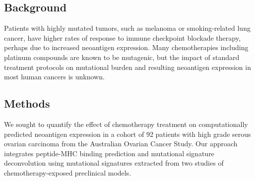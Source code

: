 \subsection*{Background}
Patients with highly mutated tumors, such as melanoma or smoking-related lung cancer, have higher rates of response to immune checkpoint blockade therapy, perhaps due to increased neoantigen expression. Many chemotherapies including platinum compounds are known to be mutagenic, but the impact of standard treatment protocols on mutational burden and resulting neoantigen expression in most human cancers is unknown.


\subsection*{Methods}

We sought to quantify the effect of chemotherapy treatment on computationally predicted neoantigen expression in a cohort of 92 patients with high grade serous ovarian carcinoma from the Australian Ovarian Cancer Study. Our approach integrates peptide-MHC binding prediction and mutational signature deconvolution using mutational signatures extracted from two studies of chemotherapy-exposed preclinical models.




